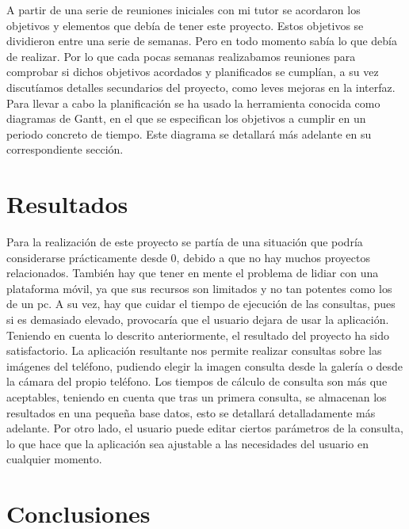 A partir de una serie de reuniones iniciales con mi tutor se acordaron los objetivos y elementos que debía de tener este proyecto. Estos objetivos se dividieron entre una serie de semanas. Pero en todo momento sabía lo que debía de realizar. Por lo que cada pocas semanas realizabamos reuniones para comprobar si dichos objetivos acordados y planificados se cumplían, a su vez discutíamos detalles secundarios del proyecto, como leves mejoras en la interfaz.\\

Para llevar a cabo la planificación se ha usado la herramienta conocida como diagramas de Gantt, en el que se especifican los objetivos a cumplir en un periodo concreto de tiempo. Este diagrama se detallará más adelante en su correspondiente sección.\\

\section{Resultados}

Para la realización de este proyecto se partía de una situación que podría considerarse prácticamente desde 0, debido a que no hay muchos proyectos relacionados. También hay que tener en mente el problema de lidiar con una plataforma móvil, ya que sus recursos son limitados y no tan potentes como los de un pc. A su vez, hay que cuidar el tiempo de ejecución de las consultas, pues si es demasiado elevado, provocaría que el usuario dejara de usar la aplicación.\\

Teniendo en cuenta lo descrito anteriormente, el resultado del proyecto ha sido satisfactorio. La aplicación resultante nos permite realizar consultas sobre las imágenes del teléfono, pudiendo elegir la imagen consulta desde la galería o desde la cámara del propio teléfono. Los tiempos de cálculo de consulta son más que aceptables, teniendo en cuenta que tras un primera consulta, se almacenan los resultados en una pequeña base datos, esto se detallará detalladamente más adelante. Por otro lado, el usuario puede editar ciertos parámetros de la consulta, lo que hace que la aplicación sea ajustable a las necesidades del usuario en cualquier momento.\\

\section{Conclusiones}

